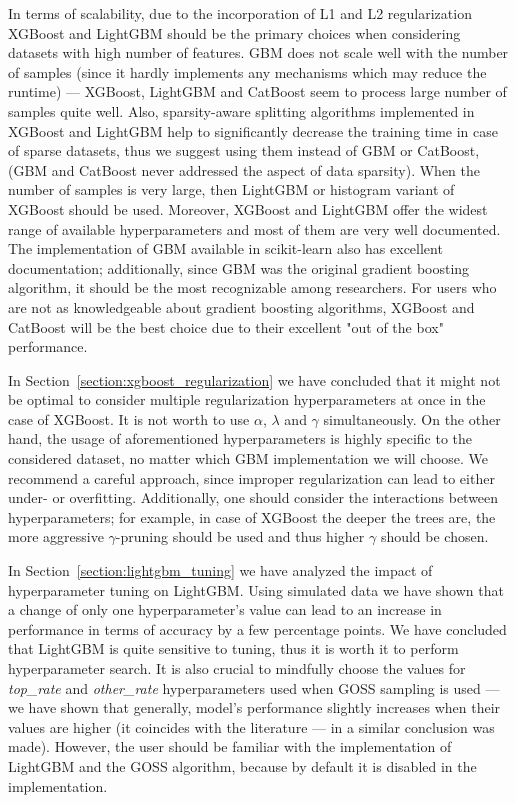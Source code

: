 \documentclass[magisterska, english]{pwr_wmat_praca_dyplomowa}
\theoremstyle{plain}
\numberwithin{theorem}{chapter}
\theoremstyle{definition}
\numberwithin{theorem}{chapter}
\begin{document}
In terms of scalability, due to the incorporation of L1 and L2 regularization XGBoost and LightGBM should be the primary choices when considering datasets with high number of features. GBM does not scale well with the number of samples (since it hardly implements any mechanisms which may reduce the runtime) --- XGBoost, LightGBM and CatBoost seem to process large number of samples quite well. Also, sparsity-aware splitting algorithms implemented in XGBoost and LightGBM help to significantly decrease the training time in case of sparse datasets, thus we suggest using them instead of GBM or CatBoost, (GBM and CatBoost never addressed the aspect of data sparsity).  When the number of samples is very large, then LightGBM or histogram variant of XGBoost should be used. Moreover, XGBoost and LightGBM offer the widest range of available hyperparameters and most of them are very well documented. The implementation of GBM available in scikit-learn \cite{sklearn} also has excellent documentation; additionally, since GBM \cite{friedman_gbm} was the original gradient boosting algorithm, it should be the most recognizable among researchers. For users who are not as knowledgeable about gradient boosting algorithms, XGBoost and CatBoost will be the best choice due to their excellent "out of the box" performance.

In Section~\ref{section:xgboost_regularization} we have concluded that it might not be optimal to consider multiple regularization hyperparameters at once in the case of XGBoost. It is not worth to use $\alpha$, $\lambda$ and $\gamma$ simultaneously. On the other hand, the usage of aforementioned hyperparameters is highly specific to the considered dataset, no matter which GBM implementation we will choose. We recommend a careful approach, since improper regularization can lead to either under- or overfitting. Additionally, one should consider the interactions between hyperparameters; for example, in case of XGBoost the deeper the trees are, the more aggressive $\gamma$-pruning should be used and thus higher $\gamma$ should be chosen.

In Section~\ref{section:lightgbm_tuning} we have analyzed the impact of hyperparameter tuning on LightGBM. Using simulated data we have shown that a change of only one hyperparameter's value can lead to an increase in performance in terms of accuracy by a few percentage points. We have concluded that LightGBM is quite sensitive to tuning, thus it is worth it to perform hyperparameter search. It is also crucial to mindfully choose the values for \emph{top\_rate} and \emph{other\_rate} hyperparameters used when GOSS sampling is used --- we have shown that generally, model's performance slightly increases when their values are higher (it coincides with the literature --- in \cite{comparative_analysis} a similar conclusion was made). However, the user should be familiar with the implementation of LightGBM \cite{lightgbm} and the GOSS algorithm, because by default it is disabled in the implementation.
\end{document}
